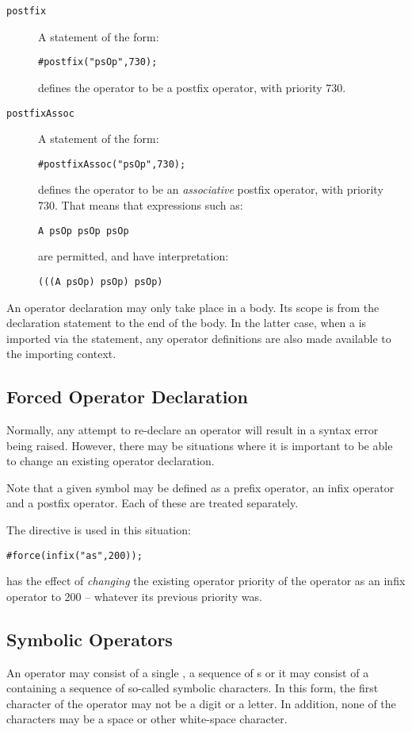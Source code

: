 \begin{description}
\item[\tt postfix]
A statement of the form:
\begin{lstlisting}
#postfix("psOp",730);
\end{lstlisting}
defines the operator  to be a postfix operator, with priority 730. 

\item[\tt postfixAssoc]
A statement of the form:
\begin{lstlisting}
#postfixAssoc("psOp",730);
\end{lstlisting}
defines the operator  to be an \emph{associative} postfix operator, with priority 730. That means that expressions such as:
\begin{lstlisting}
A psOp psOp psOp
\end{lstlisting}
are permitted, and have interpretation:
\begin{lstlisting}
(((A psOp) psOp) psOp)
\end{lstlisting}

\end{description}
An operator declaration may only take place in a  body. Its scope is from the declaration statement to the end of the  body. In the latter case, when a  is imported via the  statement, any operator definitions are also made available to the importing context.

\subsection{Forced Operator Declaration}
Normally, any attempt to re-declare an operator will result in a syntax error being raised. However, there may be situations where it is important to be able to change an existing operator declaration.
\begin{aside}
Note that a given symbol may be defined as a prefix operator, an infix operator and a postfix operator. Each of these are treated separately.
\end{aside}

The  directive is used in this situation:
\begin{lstlisting}
#force(infix("as",200));
\end{lstlisting}
has the effect of \emph{changing} the existing operator priority of the  operator as an infix operator to 200 -- whatever its previous priority was.

\subsection{Symbolic Operators}
\label{symbolicOperators}
An operator may consist of a single , a sequence of s or it may consist of a  containing a sequence of so-called symbolic characters. In this form, the first character of the operator may not be a digit or a letter. In addition, none of the characters may be a space or other white-space character.

